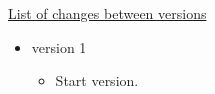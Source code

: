 \underline{List of changes between versions}

\begin{itemize}


\item version 1 
\begin{itemize}
\item Start version.
\end{itemize}

\end{itemize}

\clearpage

